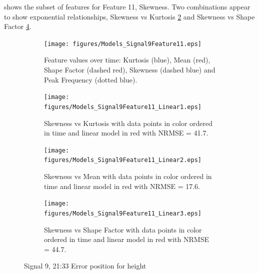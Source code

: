 \documentclass[]{article}
\begin{document}
 shows the subset of features for Feature 11, Skewness. Two combinations appear to show exponential relationships, Skewness vs Kurtosis \cref{fig:Models_Signal9Feature11_Linear1} and Skewness vs Shape Factor \cref{fig:Models_Signal9Feature11_Linear3}.
\begin{figure}[H]
	\captionsetup[subfigure]{}
    \centering
		\begin{subfigure}[t]{.45\textwidth}
		  \centering
    			\texttt{[image: figures/Models\_Signal9Feature11.eps]}
		  	\caption{Feature values over time: Kurtosis (blue), Mean (red), Shape Factor (dashed red), Skewness (dashed blue) and Peak Frequency (dotted blue).}
		  	\label{fig:Models_Signal9Feature11}
		\end{subfigure}\hspace{\fill} %
		\begin{subfigure}[t]{.45\textwidth}
		  \centering
 		   	\texttt{[image: figures/Models\_Signal9Feature11\_Linear1.eps]}
		  	\caption{Skewness vs Kurtosis with data points in color ordered in time and linear model in red with \gls{NRMSE} = 41.7.}
		  	\label{fig:Models_Signal9Feature11_Linear1}
		\end{subfigure}
		\bigskip
		\begin{subfigure}[t]{.45\textwidth}
		  \centering
    			\texttt{[image: figures/Models\_Signal9Feature11\_Linear2.eps]}
		  	\caption{Skewness vs Mean with data points in color ordered in time and linear model in red with \gls{NRMSE} = 17.6.}
		  	\label{fig:Models_Signal9Feature11_Linear2}
		\end{subfigure}\hspace{\fill} %
		\begin{subfigure}[t]{.45\textwidth}
		  \centering
 		   	\texttt{[image: figures/Models\_Signal9Feature11\_Linear3.eps]}
		  	\caption{Skewness vs Shape Factor with data points in color ordered in time and linear model in red with \gls{NRMSE} = 44.7.}
		  	\label{fig:Models_Signal9Feature11_Linear3}
		\end{subfigure}
    \caption{Signal 9, 21:33 Error position for height}
    \label{fig:Models_Signal9Feature11_Caption}
\end{figure}
\end{document}
